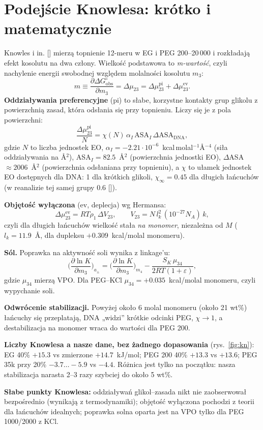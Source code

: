 \documentclass[11pt,a4paper]{article}
\newcommand{\citone}[1]{\citsep\ref{#1}\gdef\citsep{,\,}}
\newcommand{\cit}[1]{[\gdef\citsep{}\forcsvlist{\citone}{#1}]}
\begin{document}
\section{Podejście Knowlesa: krótko i matematycznie}
Knowles i in. \cit{b:kn11} mierzą topnienie 12-meru w EG i PEG 200--20\,000 i rozkładają efekt kosolutu na dwa człony. Wielkość podstawowa to \emph{m-wartość}, czyli nachylenie energii swobodnej względem molalności kosolutu $m_3$:
$$m\equiv\frac{\partial\Delta G^\circ_\text{obs}}{\partial m_3}=\Delta\mu_{23}=\Delta\mu^\text{pi}_{23}+\Delta\mu^\text{ev}_{23}.$$
\textbf{Oddziaływania preferencyjne} (pi) to słabe, korzystne kontakty grup glikolu z powierzchnią zasad, która odsłania się przy topnieniu. Liczy się je z pola powierzchni:
$$\frac{\Delta\mu^\text{pi}_{23}}{N}=\chi(N)\,\alpha_I\,\text{ASA}_I\,\Delta\text{ASA}_\text{DNA},$$
gdzie $N$ to liczba jednostek EO, $\alpha_I=-2.21\cdot10^{-6}$~kcal\,molal$^{-1}$Å$^{-4}$ (siła oddziaływania na Å$^2$), ASA$_I=82.5$~Å$^2$ (powierzchnia jednostki EO), $\Delta$ASA $\approx2006$~Å$^2$ (powierzchnia odsłaniana przy topnieniu), a $\chi$ to ułamek jednostek EO dostępnych dla DNA: 1 dla krótkich glikoli, $\chi_\infty=0.45$ dla długich łańcuchów (w reanalizie tej samej grupy 0.6 \cit{b:shkel}).

\textbf{Objętość wyłączona} (ev, deplecja) wg Hermansa:
$$\Delta\mu^\text{ev}_{23}=RT\rho_1\,\Delta V_{23},\qquad V_{23}=N\,l_k^2\,(10^{-27}N_A)\,k,$$
czyli dla długich łańcuchów wielkość stała \emph{na monomer}, niezależna od $M$ ($l_k=11.9$~Å, dla dupleksu $+0.309$~kcal/molal monomeru).

\textbf{Sól.} Poprawka na aktywność soli wynika z linkage'u:
$$\Big(\frac{\partial\ln K}{\partial m_3}\Big)_{a_\pm}=\Big(\frac{\partial\ln K}{\partial m_3}\Big)_{m_4}-\frac{S_K\,\mu_{34}}{2RT(1+\varepsilon)},$$
gdzie $\mu_{34}$ mierzą VPO. Dla PEG--KCl $\mu_{34}=+0.035$~kcal/molal monomeru, czyli wypychanie soli.

\textbf{Odwrócenie stabilizacji.} Powyżej około 6 molal monomeru (około 21 wt\%) łańcuchy się przeplatają, DNA „widzi” krótkie odcinki PEG, $\chi\to1$, a destabilizacja na monomer wraca do wartości dla PEG 200.

\textbf{Liczby Knowlesa a nasze dane, bez żadnego dopasowania} (rys.~\ref{fig:kn}): EG 40\% $+15.3$ vs zmierzone $+14.7$~kJ/mol; PEG 200 40\% $+13.3$ vs $+13.6$; PEG 35k przy 20\% $-3.7\ldots-5.9$ vs $-4.4$. Różnica jest tylko na początku: nasza stabilizacja narasta 2--3 razy szybciej do około 5 wt\%.

\textbf{Słabe punkty Knowlesa:} oddziaływań glikol--zasada nikt nie zaobserwował bezpośrednio (wynikają z termodynamiki); objętość wyłączona pochodzi z teorii dla łańcuchów idealnych; poprawka solna oparta jest na VPO tylko dla PEG 1000/2000 z KCl.
\end{document}
